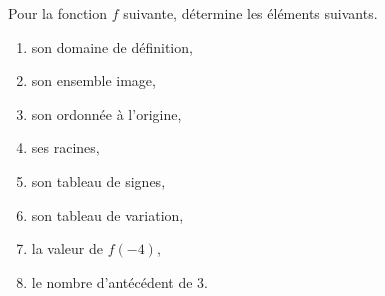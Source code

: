 %
%
    Pour la fonction $f$ suivante, détermine les éléments suivants.
    \begin{center}
        
    \end{center}
    \begin{enumerate}[cols=2]
        \item son domaine de définition,
        \item son ensemble image,
        \item son ordonnée à l'origine,
        \item ses racines,
        \item son tableau de signes,
        \item son tableau de variation,
        \item la valeur de $f(-4)$,
        \item le nombre d'antécédent de $3$.
    \end{enumerate}
